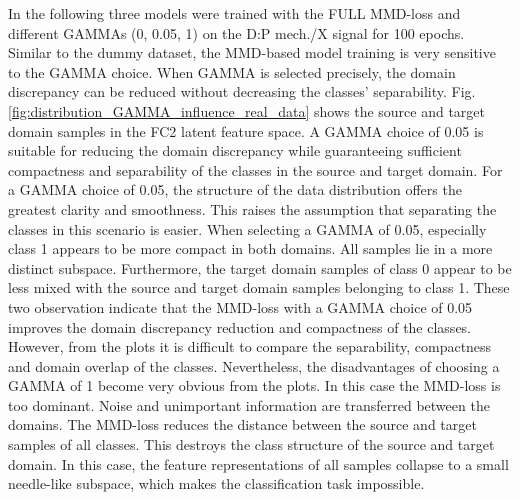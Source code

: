 In the following three models were trained with the FULL MMD-loss and different GAMMAs (0, 0.05, 1) on the D:P mech./X signal for 100 epochs. Similar to the dummy dataset, the MMD-based model training is very sensitive to the GAMMA choice. When GAMMA is selected precisely, the domain discrepancy can be reduced without decreasing the classes' separability. Fig. \ref{fig:distribution_GAMMA_influence_real_data} shows the source and target domain samples in the FC2 latent feature space. A GAMMA choice of 0.05 is suitable for reducing the domain discrepancy while guaranteeing sufficient compactness and separability of the classes in the source and target domain. For a GAMMA choice of 0.05, the structure of the data distribution offers the greatest clarity and smoothness. This raises the assumption that separating the classes in this scenario is easier. When selecting a GAMMA of 0.05, especially class 1 appears to be more compact in both domains. All samples lie in a more distinct subspace. Furthermore, the target domain samples of class 0 appear to be less mixed with the source and target domain samples belonging to class 1. These two observation indicate that the MMD-loss with a GAMMA choice of 0.05 improves the domain discrepancy reduction and compactness of the classes. However, from the plots it is difficult to compare the separability, compactness and domain overlap of the classes. Nevertheless, the disadvantages of choosing a GAMMA of 1 become very obvious from the plots. In this case the MMD-loss is too dominant. Noise and unimportant information are transferred between the domains. The MMD-loss reduces the distance between the source and target samples of all classes. This destroys the class structure of the source and target domain. In this case, the feature representations of all samples collapse to a small needle-like subspace, which makes the classification task impossible.

